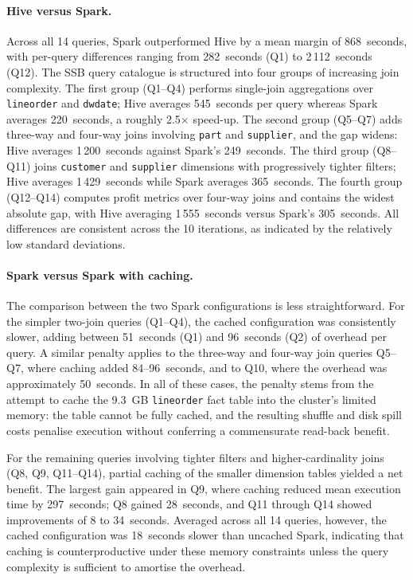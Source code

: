 \paragraph{Hive versus Spark.} Across all 14 queries, Spark outperformed Hive
by a mean margin of 868~seconds, with per-query differences ranging from
282~seconds (Q1) to 2\,112~seconds (Q12). The SSB query catalogue is
structured into four groups of increasing join complexity. The first group
(Q1--Q4) performs single-join aggregations over \texttt{lineorder} and
\texttt{dwdate}; Hive averages 545~seconds per query whereas Spark averages
220~seconds, a roughly 2.5$\times$ speed-up. The second group (Q5--Q7) adds
three-way and four-way joins involving \texttt{part} and \texttt{supplier},
and the gap widens: Hive averages 1\,200~seconds against Spark's
249~seconds. The third group (Q8--Q11) joins \texttt{customer} and
\texttt{supplier} dimensions with progressively tighter filters; Hive
averages 1\,429~seconds while Spark averages 365~seconds. The fourth group
(Q12--Q14) computes profit metrics over four-way joins and contains the
widest absolute gap, with Hive averaging 1\,555~seconds versus Spark's
305~seconds. All differences are consistent across the 10 iterations, as
indicated by the relatively low standard deviations.

\paragraph{Spark versus Spark with caching.} The comparison between the two
Spark configurations is less straightforward. For the simpler two-join queries
(Q1--Q4), the cached configuration was consistently slower, adding between
51~seconds (Q1) and 96~seconds (Q2) of overhead per query. A similar penalty
applies to the three-way and four-way join queries Q5--Q7, where caching added
84--96~seconds, and to Q10, where the overhead was approximately 50~seconds. In
all of these cases, the penalty stems from the attempt to cache the 9.3~GB
\texttt{lineorder} fact table into the cluster's limited memory: the table
cannot be fully cached, and the resulting shuffle and disk spill costs penalise
execution without conferring a commensurate read-back benefit.

For the remaining queries involving tighter filters and higher-cardinality
joins (Q8, Q9, Q11--Q14), partial caching of the smaller dimension tables
yielded a net benefit. The largest gain appeared in Q9, where caching reduced
mean execution time by 297~seconds; Q8 gained 28~seconds, and Q11 through Q14
showed improvements of 8 to 34~seconds. Averaged across all 14 queries,
however, the cached configuration was 18~seconds slower than uncached Spark,
indicating that caching is counterproductive under these memory constraints
unless the query complexity is sufficient to amortise the overhead.

